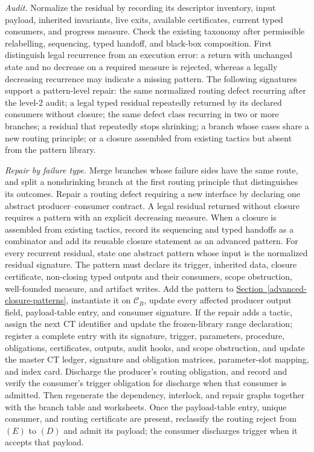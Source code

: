 \documentclass[
  11pt,
]{article}
\theoremstyle{definition}
\newcommand{\secref}[1]{\hyperref[#1]{Section~\ref*{#1}}}
\begin{document}
\begin{enumerate}
  \emph{Audit.} Normalize the residual by recording its descriptor
  inventory, input payload, inherited invariants, live exits, available
  certificates, current typed consumers, and progress measure. Check the
  existing taxonomy after permissible relabelling, sequencing, typed
  handoff, and black-box composition. First distinguish legal recurrence
  from an execution error: a return with unchanged state and no decrease
  on a required measure is rejected, whereas a legally decreasing
  recurrence may indicate a missing pattern. The following signatures
  support a pattern-level repair: the same normalized routing defect
  recurring after the level-2 audit; a legal typed residual repeatedly
  returned by its declared consumers without closure; the same defect class
  recurring in two or more branches; a residual that repeatedly stops
  shrinking; a branch whose cases share a new routing principle; or a
  closure assembled from existing tactics but absent from the pattern
  library.

  \emph{Repair by failure type.} Merge branches whose failure sides have
  the same route, and split a nonshrinking branch at the first routing
  principle that distinguishes its outcomes. Repair a routing defect
  requiring a new interface by declaring one abstract producer--consumer
  contract. A legal residual returned without closure requires a pattern
  with an explicit decreasing measure. When a closure is assembled from existing tactics,
  record its sequencing and typed handoffs as a combinator and add its
  reusable closure statement as an advanced pattern. For every recurrent
  residual, state one abstract pattern whose input is
  the normalized residual signature. The pattern must declare its
  trigger, inherited data, closure certificate, non-closing typed outputs
  and their consumers, scope obstruction, well-founded measure, and
  artifact writes. Add the pattern to
  \secref{advanced-closure-patterns}, instantiate it on \(\mathcal C_B\),
  update every affected producer output field, payload-table entry, and
  consumer signature. If the repair adds a tactic, assign the next CT
  identifier and update the frozen-library range declaration; register a
  complete entry with its signature, trigger, parameters, procedure,
  obligations, certificates, outputs, audit hooks, and scope obstruction,
  and update the master CT ledger, signature and obligation matrices,
  parameter-slot mapping, and index card. Discharge the producer's
  routing obligation, and record and verify the consumer's trigger
  obligation for discharge when that consumer is admitted. Then
  regenerate the dependency, interlock, and repair graphs together with
  the branch table and worksheets. Once the payload-table entry, unique
  consumer, and routing certificate are present, reclassify the routing
  reject from \((E)\) to \((D)\) and admit its payload; the consumer
  discharges trigger when it accepts that payload.


\end{enumerate}
\end{document}
